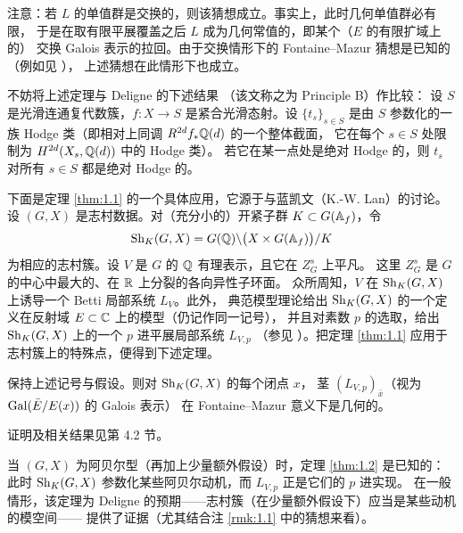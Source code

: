 注意：若 $L$ 的单值群是交换的，则该猜想成立。事实上，此时几何单值群必有限，
于是在取有限平展覆盖之后 $L$ 成为几何常值的，即某个（$E$ 的有限扩域上的）
交换 Galois 表示的拉回。由于交换情形下的 Fontaine--Mazur 猜想是已知的（例如见 \cite{He}），
上述猜想在此情形下也成立。

\begin{rmk}\label{rmk:1.2}
不妨将上述定理与 Deligne 的下述结果 \cite{DM}（该文称之为 Principle B）作比较：
设 $S$ 是光滑连通复代数簇，$f:X\to S$ 是紧合光滑态射。设 $\{t_s\}_{s\in S}$
是由 $S$ 参数化的一族 Hodge 类（即相对上同调 $R^{2d}f_*\mathbb{Q}(d)$ 的一个整体截面，
它在每个 $s\in S$ 处限制为 $H^{2d}(X_s,\mathbb{Q}(d))$ 中的 Hodge 类）。
若它在某一点处是绝对 Hodge 的，则 $t_s$ 对所有 $s\in S$ 都是绝对 Hodge 的。
\end{rmk}

下面是定理 \ref{thm:1.1} 的一个具体应用，它源于与蓝凯文（K.-W. Lan）的讨论。
设 $(G,X)$ 是志村数据。对（充分小的）开紧子群 $K\subset G(\mathbb{A}_f)$，令
\[
  \operatorname{Sh}_K(G,X)=G(\mathbb{Q})\backslash\bigl(X\times G(\mathbb{A}_f)\bigr)/K
\]
为相应的志村簇。设 $V$ 是 $G$ 的 $\mathbb{Q}$ 有理表示，且它在 $Z_G^s$ 上平凡。
这里 $Z_G^s$ 是 $G$ 的中心中最大的、在 $\mathbb{R}$ 上分裂的各向异性子环面。
众所周知，$V$ 在 $\operatorname{Sh}_K(G,X)$ 上诱导一个 Betti 局部系统 $L_V$。此外，
典范模型理论给出 $\operatorname{Sh}_K(G,X)$ 的一个定义在反射域 $E\subset\mathbb{C}$ 上的模型（仍记作同一记号），
并且对素数 $p$ 的选取，给出 $\operatorname{Sh}_K(G,X)$ 上的一个 $p$ 进平展局部系统 $L_{V,p}$
（参见 \cite[§III.6]{Mi1}）。把定理 \ref{thm:1.1} 应用于志村簇上的特殊点，便得到下述定理。

\begin{thm}\label{thm:1.2}
保持上述记号与假设。则对 $\operatorname{Sh}_K(G,X)$ 的每个闭点 $x$，
茎 $(L_{V,p})_{\bar x}$（视为 $\operatorname{Gal}(\bar E/E(x))$ 的 Galois 表示）
在 Fontaine--Mazur 意义下是几何的。
\end{thm}

证明及相关结果见第 4.2 节。

\begin{rmk}\label{rmk:1.3}
当 $(G,X)$ 为阿贝尔型（再加上少量额外假设）时，定理 \ref{thm:1.2} 是已知的：
此时 $\operatorname{Sh}_K(G,X)$ 参数化某些阿贝尔动机，而 $L_{V,p}$ 正是它们的 $p$ 进实现。
在一般情形，该定理为 Deligne 的预期——志村簇（在少量额外假设下）应当是某些动机的模空间——
提供了证据（尤其结合注 \ref{rmk:1.1} 中的猜想来看）。
\end{rmk}

